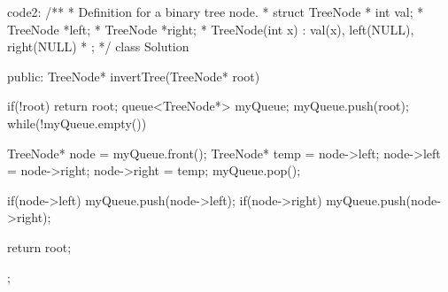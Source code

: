code2:
/**
 * Definition for a binary tree node.
 * struct TreeNode {
 *     int val;
 *     TreeNode *left;
 *     TreeNode *right;
 *     TreeNode(int x) : val(x), left(NULL), right(NULL) {}
 * };
 */
class Solution {
public:
    TreeNode* invertTree(TreeNode* root) {
        if(!root) return root;
        queue<TreeNode*> myQueue;
        myQueue.push(root);
        while(!myQueue.empty())
        {
            TreeNode* node = myQueue.front();
            TreeNode* temp = node->left;
            node->left = node->right;
            node->right = temp;
            myQueue.pop();
            
            if(node->left) myQueue.push(node->left);
            if(node->right) myQueue.push(node->right);
        }
        return root;
    }
};